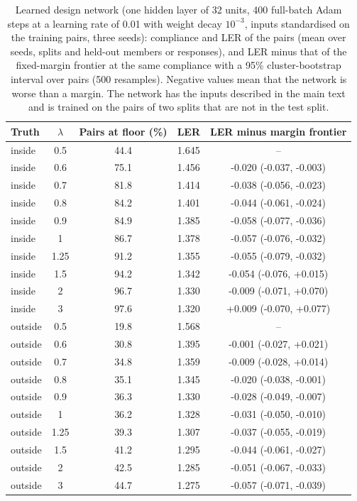 \begin{table}[t]
\centering\small
\caption{Learned design network (one hidden layer of 32 units, 400 full-batch Adam steps at a learning rate of 0.01 with weight decay $10^{-3}$, inputs standardised on the training pairs, three seeds): compliance and LER of the pairs (mean over seeds, splits and held-out members or responses), and LER minus that of the fixed-margin frontier at the same compliance with a 95\% cluster-bootstrap interval over pairs (500 resamples). Negative values mean that the network is worse than a margin. The network has the inputs described in the main text and is trained on the pairs of two splits that are not in the test split.}\label{tab:suplearned}
\begin{tabular}{lcccc}
\toprule
Truth & $\lambda$ & Pairs at floor (\%) & LER & LER minus margin frontier\\
\midrule
inside & 0.5 & 44.4 & 1.645 & --\\
inside & 0.6 & 75.1 & 1.456 & -0.020 (-0.037, -0.003)\\
inside & 0.7 & 81.8 & 1.414 & -0.038 (-0.056, -0.023)\\
inside & 0.8 & 84.2 & 1.401 & -0.044 (-0.061, -0.024)\\
inside & 0.9 & 84.9 & 1.385 & -0.058 (-0.077, -0.036)\\
inside & 1 & 86.7 & 1.378 & -0.057 (-0.076, -0.032)\\
inside & 1.25 & 91.2 & 1.355 & -0.055 (-0.079, -0.032)\\
inside & 1.5 & 94.2 & 1.342 & -0.054 (-0.076, +0.015)\\
inside & 2 & 96.7 & 1.330 & -0.009 (-0.071, +0.070)\\
inside & 3 & 97.6 & 1.320 & +0.009 (-0.070, +0.077)\\
outside & 0.5 & 19.8 & 1.568 & --\\
outside & 0.6 & 30.8 & 1.395 & -0.001 (-0.027, +0.021)\\
outside & 0.7 & 34.8 & 1.359 & -0.009 (-0.028, +0.014)\\
outside & 0.8 & 35.1 & 1.345 & -0.020 (-0.038, -0.001)\\
outside & 0.9 & 36.3 & 1.330 & -0.028 (-0.049, -0.007)\\
outside & 1 & 36.2 & 1.328 & -0.031 (-0.050, -0.010)\\
outside & 1.25 & 39.3 & 1.307 & -0.037 (-0.055, -0.019)\\
outside & 1.5 & 41.2 & 1.295 & -0.044 (-0.061, -0.027)\\
outside & 2 & 42.5 & 1.285 & -0.051 (-0.067, -0.033)\\
outside & 3 & 44.7 & 1.275 & -0.057 (-0.071, -0.039)\\
\bottomrule
\end{tabular}
\end{table}
